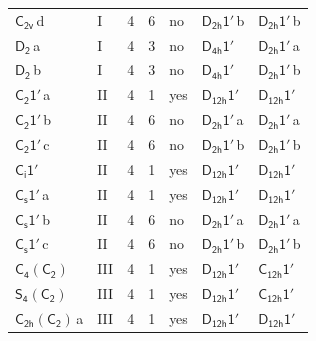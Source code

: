 \documentclass[10pt,a4paper]{article}
\numberwithin{equation}{section}
\newcommand{\grp}[1]{\mathsf{#1}}
\newcommand{\clsletter}[1]{\,{\scriptsize\color{black!55}#1}}
\begin{document}
{\begin{longtable}{@{}llrrlll@{}}
\href{../../../rotation/data/pdf/C2v.pdf}{$\grp{C_{2v}}$}\clsletter{d} & I & 4 & 6 & no & \href{D2h-1p.pdf}{$\grp{D_{2h}1'}$}\clsletter{b} & \href{D2h-1p.pdf}{$\grp{D_{2h}1'}$}\clsletter{b}\\
\href{../../../rotation/data/pdf/D2.pdf}{$\grp{D_{2}}$}\clsletter{a} & I & 4 & 3 & no & \href{D4h-1p.pdf}{$\grp{D_{4h}1'}$} & \href{D2h-1p.pdf}{$\grp{D_{2h}1'}$}\clsletter{a}\\
\href{../../../rotation/data/pdf/D2.pdf}{$\grp{D_{2}}$}\clsletter{b} & I & 4 & 3 & no & \href{D4h-1p.pdf}{$\grp{D_{4h}1'}$} & \href{D2h-1p.pdf}{$\grp{D_{2h}1'}$}\clsletter{b}\\
\href{C2-1p.pdf}{$\grp{C_{2}1'}$}\clsletter{a} & II & 4 & 1 & yes & \href{D12h-1p.pdf}{$\grp{D_{12h}1'}$} & \href{D12h-1p.pdf}{$\grp{D_{12h}1'}$}\\
\href{C2-1p.pdf}{$\grp{C_{2}1'}$}\clsletter{b} & II & 4 & 6 & no & \href{D2h-1p.pdf}{$\grp{D_{2h}1'}$}\clsletter{a} & \href{D2h-1p.pdf}{$\grp{D_{2h}1'}$}\clsletter{a}\\
\href{C2-1p.pdf}{$\grp{C_{2}1'}$}\clsletter{c} & II & 4 & 6 & no & \href{D2h-1p.pdf}{$\grp{D_{2h}1'}$}\clsletter{b} & \href{D2h-1p.pdf}{$\grp{D_{2h}1'}$}\clsletter{b}\\
\href{S2-1p.pdf}{$\grp{C_{i}1'}$} & II & 4 & 1 & yes & \href{D12h-1p.pdf}{$\grp{D_{12h}1'}$} & \href{D12h-1p.pdf}{$\grp{D_{12h}1'}$}\\
\href{C1v-1p.pdf}{$\grp{C_{s}1'}$}\clsletter{a} & II & 4 & 1 & yes & \href{D12h-1p.pdf}{$\grp{D_{12h}1'}$} & \href{D12h-1p.pdf}{$\grp{D_{12h}1'}$}\\
\href{C1v-1p.pdf}{$\grp{C_{s}1'}$}\clsletter{b} & II & 4 & 6 & no & \href{D2h-1p.pdf}{$\grp{D_{2h}1'}$}\clsletter{a} & \href{D2h-1p.pdf}{$\grp{D_{2h}1'}$}\clsletter{a}\\
\href{C1v-1p.pdf}{$\grp{C_{s}1'}$}\clsletter{c} & II & 4 & 6 & no & \href{D2h-1p.pdf}{$\grp{D_{2h}1'}$}\clsletter{b} & \href{D2h-1p.pdf}{$\grp{D_{2h}1'}$}\clsletter{b}\\
\href{C4-C2.pdf}{$\grp{C_{4}}(\grp{C_{2}})$} & III & 4 & 1 & yes & \href{D12h-1p.pdf}{$\grp{D_{12h}1'}$} & \href{C12h-1p.pdf}{$\grp{C_{12h}1'}$}\\
\href{S4-C2.pdf}{$\grp{S_{4}}(\grp{C_{2}})$} & III & 4 & 1 & yes & \href{D12h-1p.pdf}{$\grp{D_{12h}1'}$} & \href{C12h-1p.pdf}{$\grp{C_{12h}1'}$}\\
\href{C2h-C2.pdf}{$\grp{C_{2h}}(\grp{C_{2}})$}\clsletter{a} & III & 4 & 1 & yes & \href{D12h-1p.pdf}{$\grp{D_{12h}1'}$} & \href{D12h-1p.pdf}{$\grp{D_{12h}1'}$}\\

\end{longtable}}
\end{document}
